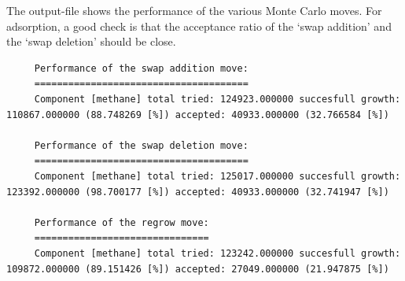 The output-file shows the performance of the various Monte Carlo moves. For adsorption, a good check is that the acceptance ratio
of the `swap addition' and the `swap deletion' should be close.
\begin{tiny}
\begin{verbatim}
     Performance of the swap addition move:
     ======================================
     Component [methane] total tried: 124923.000000 succesfull growth: 110867.000000 (88.748269 [%]) accepted: 40933.000000 (32.766584 [%])

     Performance of the swap deletion move:
     ======================================
     Component [methane] total tried: 125017.000000 succesfull growth: 123392.000000 (98.700177 [%]) accepted: 40933.000000 (32.741947 [%])

     Performance of the regrow move:
     ===============================
     Component [methane] total tried: 123242.000000 succesfull growth: 109872.000000 (89.151426 [%]) accepted: 27049.000000 (21.947875 [%])
\end{verbatim}
\end{tiny}

